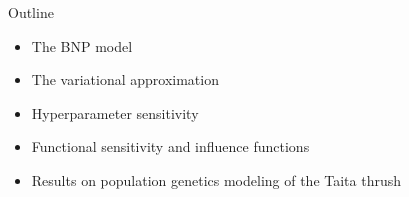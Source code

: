 \begin{frame}{Outline}
\begin{itemize}
\item The BNP model
\vspace{0.1in}

\item The variational approximation
\vspace{0.1in}

\item Hyperparameter sensitivity
\vspace{0.1in}

\item Functional sensitivity and influence functions
\vspace{0.1in}

\item Results on population genetics modeling of the Taita thrush 
\vspace{0.1in}

\end{itemize}
\end{frame}
